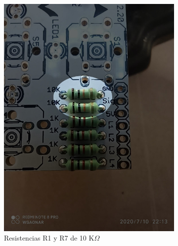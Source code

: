 \documentclass{article}
\begin{document}
\begin{figure}[htbp]
\begin{subfigure}[t]{0.3\textwidth}
        \includegraphics[width=0.9\columnwidth, height=1.2\columnwidth]{images/Botonera/botonera2.jpg}
        \caption{Resistencias R1 y R7 de 10 K$\Omega$}
        \label{fig:botonera_resistencias2}
    \end{subfigure}%
    \begin{subfigure}[t]{0.3\textwidth}
        \centering

\end{subfigure}
\end{figure}
\end{document}

